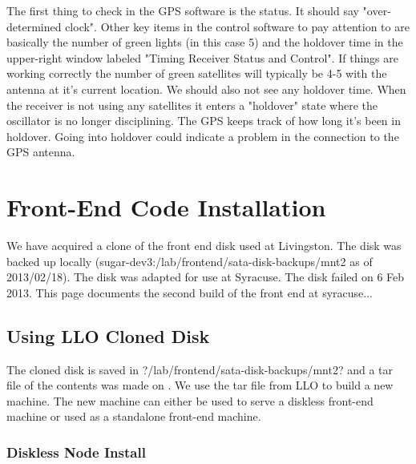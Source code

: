 The first thing to check in the GPS software is the status. It should say "over-determined clock". Other key items in the control software to pay attention to are basically the number of green lights (in this case 5) and the holdover time in the upper-right window labeled "Timing Receiver Status and Control". If things are working correctly the number of green satellites will typically be 4-5 with the antenna at it's current location. We should also not see any holdover time. When the receiver is not using any satellites it enters a "holdover" state where the oscillator is no longer disciplining. The GPS keeps track of how long it's been in holdover. Going into holdover could indicate a problem in the connection to the GPS antenna.


\section{Front-End Code Installation}

We have acquired a clone of the front end disk used at Livingston. The disk was backed up locally (sugar-dev3:/lab/frontend/sata-disk-backups/mnt2 as of 2013/02/18). The disk was adapted for use at Syracuse. The disk failed on 6 Feb 2013. This page documents the second build of the front end at syracuse...



\subsection{Using LLO Cloned Disk}

The cloned disk is saved in \lstin?/lab/frontend/sata-disk-backups/mnt2? and a tar file
of the contents was made on
. We use the tar file from LLO to build a new machine. The new machine
can either be used to serve a diskless front-end machine or used as a standalone front-end
machine.


\subsubsection{Diskless Node Install}

